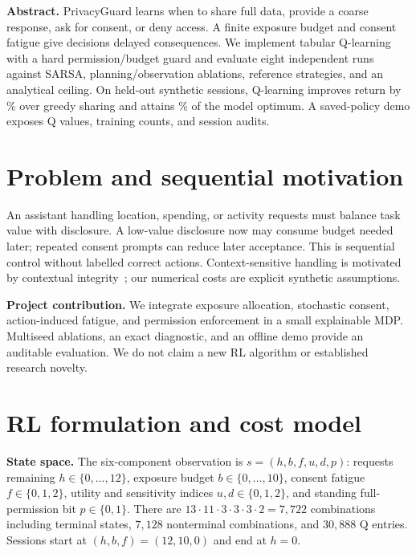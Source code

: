 \documentclass[10pt,a4paper,twocolumn]{article}
\begin{document}
\small
\textbf{Abstract.} PrivacyGuard learns when to share full data, provide a coarse response, ask for consent, or deny access. A finite exposure budget and consent fatigue give decisions delayed consequences. We implement tabular Q-learning with a hard permission/budget guard and evaluate eight independent runs against SARSA, planning/observation ablations, reference strategies, and an analytical ceiling. On held-out synthetic sessions, Q-learning improves return by \GainPercent\% over greedy sharing and attains \OptPercent\% of the model optimum. A saved-policy demo exposes Q values, training counts, and session audits.

\section{Problem and sequential motivation}
An assistant handling location, spending, or activity requests must balance task value with disclosure. A low-value disclosure now may consume budget needed later; repeated consent prompts can reduce later acceptance. This is sequential control without labelled correct actions. Context-sensitive handling is motivated by contextual integrity~\cite{nissenbaum}; our numerical costs are explicit synthetic assumptions.

\textbf{Project contribution.} We integrate exposure allocation, stochastic consent, action-induced fatigue, and permission enforcement in a small explainable MDP. Multiseed ablations, an exact diagnostic, and an offline demo provide an auditable evaluation. We do not claim a new RL algorithm or established research novelty.

\section{RL formulation and cost model}
\textbf{State space.} The six-component observation is $s=(h,b,f,u,d,p)$: requests remaining $h\in\{0,\ldots,12\}$, exposure budget $b\in\{0,\ldots,10\}$, consent fatigue $f\in\{0,1,2\}$, utility and sensitivity indices $u,d\in\{0,1,2\}$, and standing full-permission bit $p\in\{0,1\}$. There are $13\cdot11\cdot3\cdot3\cdot3\cdot2=7{,}722$ combinations including terminal states, $7{,}128$ nonterminal combinations, and $30{,}888$ Q entries. Sessions start at $(h,b,f)=(12,10,0)$ and end at $h=0$.
\end{document}
